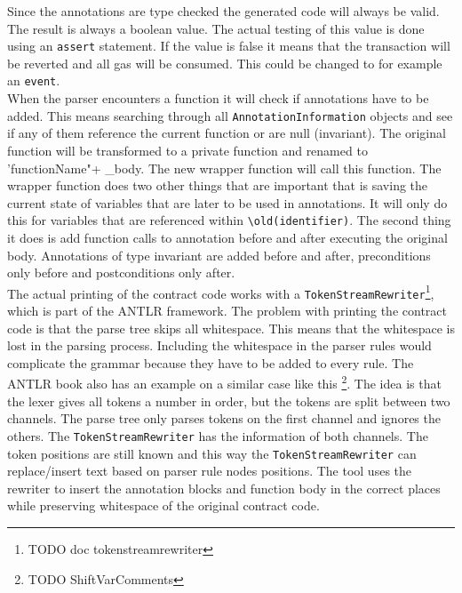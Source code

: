 \documentclass[a4paper]{article}
\begin{document}
Since the annotations are type checked the generated code will always be valid. The result is always a boolean value. The actual testing of this value is done using an \texttt{assert} statement. If the value is false it means that the transaction will be reverted and all gas will be consumed. This could be changed to for example an \texttt{event}.\\
When the parser encounters a function it will check if annotations have to be added. This means searching through all \texttt{AnnotationInformation} objects and see if any of them reference the current function or are null (invariant). The original function will be transformed to a private function and renamed to 'functionName"+ \_body. The new wrapper function will call this function. The wrapper function does two other things that are important that is saving the current state of variables that are later to be used in annotations. It will only do this for variables that are referenced within \texttt{\textbackslash old(identifier)}. The second thing it does is add function calls to annotation before and after executing the original body. Annotations of type invariant are added before and after, preconditions only before and postconditions only after. \\
The actual printing of the contract code works with a \texttt{TokenStreamRewriter}\footnote{TODO doc tokenstreamrewriter}, which is part of the ANTLR framework. The problem with printing the contract code is that the parse tree skips all whitespace. This means that the whitespace is lost in the parsing process. Including the whitespace in the parser rules would complicate the grammar because they have to be added to every rule. The ANTLR book also has an example on a similar case like this \footnote{TODO ShiftVarComments}. The idea is that the lexer gives all tokens a number in order, but the tokens are split between two channels. The parse tree only parses tokens on the first channel and ignores the others. The \texttt{TokenStreamRewriter} has the information of both channels. The token positions are still known and this way the \texttt{TokenStreamRewriter} can replace/insert text based on parser rule nodes positions. The tool uses the rewriter to insert the annotation blocks and function body in the correct places while preserving whitespace of the original contract code.
\end{document}
